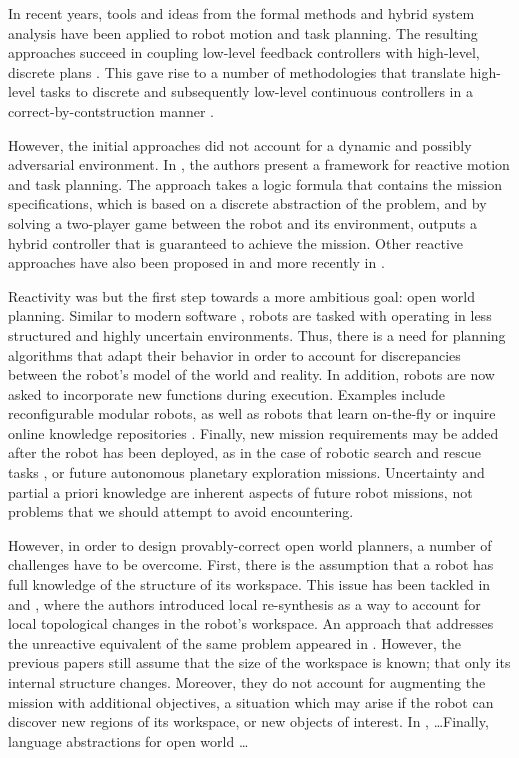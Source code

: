 In recent years, tools and ideas from the formal methods and hybrid system analysis have been applied to robot motion and task planning. The resulting approaches succeed in coupling low-level feedback controllers \cite{} with high-level, discrete plans \cite{}. This gave rise to a number of methodologies that translate high-level tasks to discrete and subsequently low-level continuous controllers in a correct-by-contstruction manner \cite{}.

However, the initial approaches did not account for a dynamic and possibly adversarial environment. In \cite{KGFP_TRO09}, the authors present a framework for reactive motion and task planning. The approach takes a logic formula that contains the mission specifications, which is based on a discrete abstraction of the problem, and by solving a two-player game between the robot and its environment, outputs a hybrid controller that is guaranteed to achieve the mission. Other reactive approaches have also been proposed in \cite{Wongpiromsarn2010} and more recently in \cite{Belta2013RSS}.

Reactivity was but the first step towards a more ambitious goal: open world planning. Similar to modern software \cite{open-world-sw}, robots are tasked with operating in less structured and highly uncertain environments. Thus, there is a need for planning algorithms that adapt their behavior in order to account for discrepancies between the robot's model of the world and reality. In addition, robots are now asked to incorporate new functions during execution. Examples include reconfigurable modular robots, as well as robots that learn on-the-fly \cite{SaxenaIJRR2012} or inquire online knowledge repositories \cite{rapyuta2013}. Finally, new mission requirements may be added after the robot has been deployed, as in the case of robotic search and rescue tasks \cite{MatthiasAI2010}, or future autonomous planetary exploration missions. Uncertainty and partial a priori knowledge are inherent aspects of future robot missions, not problems that we should attempt to avoid encountering.

However, in order to design provably-correct open world planners, a number of challenges have to be overcome. First, there is the assumption that a robot has full knowledge of the structure of its workspace. This issue has been tackled in \cite{MurrayICRA2012} and \cite{MurrayICRA2013a}, where the authors introduced local re-synthesis as a way to account for local topological changes in the robot's workspace. An approach that addresses the unreactive equivalent of the same problem appeared in \cite{Dimos2013ICRA}. However, the previous papers still assume that the size of the workspace is known; that only its internal structure changes. Moreover, they do not account for augmenting the mission with additional objectives, a situation which may arise if the robot can discover new regions of its workspace, or new objects of interest. In \cite{BingxinRSS2012}, \ldots Finally, language abstractions for open world \ldots

